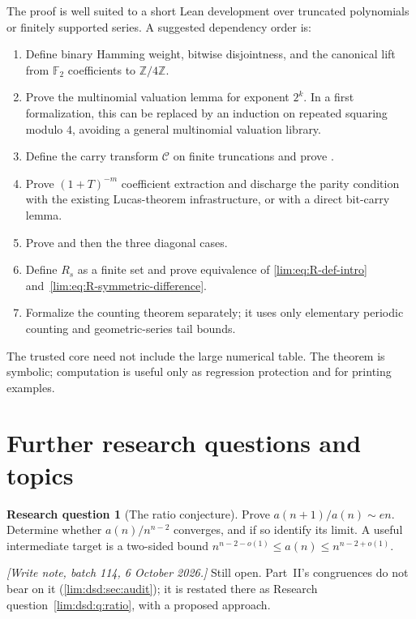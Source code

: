 \documentclass[11pt]{article}
\theoremstyle{definition}
\newtheorem{question}[theorem]{Research question}
\theoremstyle{remark}
\begin{document}
The proof is well suited to a short Lean development over truncated
polynomials or finitely supported series.  A suggested dependency order is:

\begin{enumerate}
\item Define binary Hamming weight, bitwise disjointness, and the canonical
lift from $\mathbb F_2$ coefficients to $\mathbb Z/4\mathbb Z$.
\item Prove the multinomial valuation lemma for exponent $2^k$.  In a
first formalization, this can be replaced by an induction on repeated
squaring modulo $4$, avoiding a general multinomial valuation library.
\item Define the carry transform $\mathcal C$ on finite truncations and prove
.
\item Prove $(1+T)^{-m}$ coefficient extraction and discharge the parity
condition with the existing Lucas-theorem infrastructure, or with a direct
bit-carry lemma.
\item Prove  and then the three diagonal cases.
\item Define $R_s$ as a finite set and prove equivalence of
\eqref{lim:eq:R-def-intro} and~\eqref{lim:eq:R-symmetric-difference}.
\item Formalize the counting theorem separately; it uses only elementary
periodic counting and geometric-series tail bounds.
\end{enumerate}

The trusted core need not include the large numerical table.  The theorem is
symbolic; computation is useful only as regression protection and for printing
examples.

\section{Further research questions and topics}
\label{lim:sec:questions}

\begin{question}[The ratio conjecture]
\label{lim:q:ratio}
Prove $a(n+1)/a(n)\sim en$.  Determine whether $a(n)/n^{n-2}$ converges, and
if so identify its limit.  A useful intermediate target is a two-sided bound
$n^{n-2-o(1)}\le a(n)\le n^{n-2+o(1)}$.
\end{question}

\emph{[Write note, batch 114, 6 October 2026.]} Still open. Part~II's congruences do not bear on it
(\cref{lim:dsd:sec:audit}); it is restated there as Research
question~\ref{lim:dsd:q:ratio}, with a proposed approach.
\end{document}
